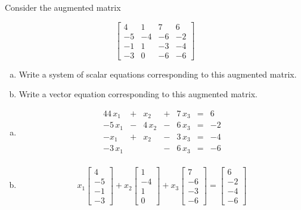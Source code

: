 
\begin{exerciseStatement}


 Consider the augmented matrix 

\[ \left[\begin{array}{ccc|c}
4 & 1 & 7 & 6 \\
-5 & -4 & -6 & -2 \\
-1 & 1 & -3 & -4 \\
-3 & 0 & -6 & -6
\end{array}\right] \]
\begin{enumerate}[(a)]
\item  Write a system of scalar equations corresponding to this augmented matrix. 
\item  Write a vector equation corresponding to this augmented matrix. 
\end{enumerate}
    
\end{exerciseStatement}
    
\begin{exerciseAnswer} 

\begin{enumerate}[(a)]
\item 
\begin{alignat*}{4} 4 \, x_{1} &+& x_{2} &+& 7 \, x_{3} &=& 6 \\-5 \, x_{1} &-& 4 \, x_{2} &-& 6 \, x_{3} &=& -2 \\-x_{1} &+& x_{2} &-& 3 \, x_{3} &=& -4 \\-3 \, x_{1} & &  &-& 6 \, x_{3} &=& -6 \\ \end{alignat*}
            
\item \[ x_{1} \left[\begin{array}{c}
4 \\
-5 \\
-1 \\
-3
\end{array}\right] + x_{2} \left[\begin{array}{c}
1 \\
-4 \\
1 \\
0
\end{array}\right] + x_{3} \left[\begin{array}{c}
7 \\
-6 \\
-3 \\
-6
\end{array}\right] = \left[\begin{array}{c}
6 \\
-2 \\
-4 \\
-6
\end{array}\right] \]
\end{enumerate}
    
\end{exerciseAnswer}
    

